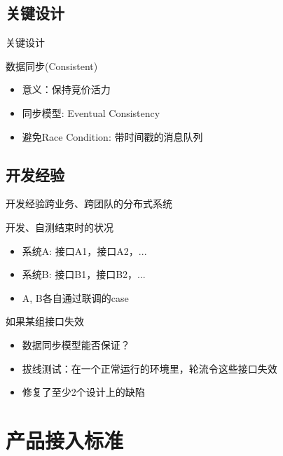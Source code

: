 \documentclass{beamer}
\begin{document}
\begin{CJK}{UTF8}{gbsn}
\subsection{关键设计}

\begin{frame}{关键设计}
  \begin{block}{数据同步(Consistent)}
    \begin{itemize}
      \item {
        意义：保持竞价活力
      }
      \item {同步模型: Eventual Consistency}
      \item {避免Race Condition: 带时间戳的消息队列}
    \end{itemize}
  \end{block}
\end{frame}

\subsection{开发经验}

\begin{frame}{开发经验}{跨业务、跨团队的分布式系统}
  \begin{block}{开发、自测结束时的状况}
    \begin{itemize}
      \item {
        系统A: 接口A1，接口A2，...
      }
      \item {
        系统B: 接口B1，接口B2，...
      }
      \item {
        A, B各自通过联调的case
      }
    \end{itemize}
    \pause
  \end{block}

  \begin{block}{如果某组接口失效}
    \begin{itemize}
      \item {
        数据同步模型能否保证？
        \pause
      }
      \item {
        拔线测试：在一个正常运行的环境里，轮流令这些接口失效
      }
      \item {
        修复了至少2个设计上的缺陷
      }
    \end{itemize}
  \end{block}
\end{frame}

\section{产品接入标准}


\end{CJK}
\end{document}
